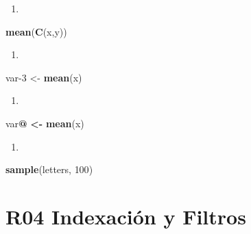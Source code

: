 \documentclass[]{book}
\newenvironment{Shaded}{\begin{snugshade}}{\end{snugshade}}
\newcommand{\DecValTok}[1]{\textcolor[rgb]{0.00,0.00,0.81}{#1}}
\newcommand{\ErrorTok}[1]{\textcolor[rgb]{0.64,0.00,0.00}{\textbf{#1}}}
\newcommand{\KeywordTok}[1]{\textcolor[rgb]{0.13,0.29,0.53}{\textbf{#1}}}
\newcommand{\NormalTok}[1]{#1}
\newcommand{\OperatorTok}[1]{\textcolor[rgb]{0.81,0.36,0.00}{\textbf{#1}}}
\newcommand{\StringTok}[1]{\textcolor[rgb]{0.31,0.60,0.02}{#1}}
\begin{document}
\begin{enumerate}
\def\labelenumi{\arabic{enumi}.}
\setcounter{enumi}{3}
\item
\end{enumerate}

\begin{Shaded}
\begin{Highlighting}[]
  \KeywordTok{mean}\NormalTok{(}\KeywordTok{C}\NormalTok{(x,y))}
\end{Highlighting}
\end{Shaded}

\begin{enumerate}
\def\labelenumi{\arabic{enumi}.}
\setcounter{enumi}{4}
\item
\end{enumerate}

\begin{Shaded}
\begin{Highlighting}[]
\NormalTok{  var}\DecValTok{-3}\NormalTok{ <-}\StringTok{ }\KeywordTok{mean}\NormalTok{(x)}
\end{Highlighting}
\end{Shaded}

\begin{enumerate}
\def\labelenumi{\arabic{enumi}.}
\setcounter{enumi}{5}
\item
\end{enumerate}

\begin{Shaded}
\begin{Highlighting}[]
\NormalTok{  var}\OperatorTok{@}\StringTok{ }\ErrorTok{<}\OperatorTok{-}\StringTok{ }\KeywordTok{mean}\NormalTok{(x)}
\end{Highlighting}
\end{Shaded}

\begin{enumerate}
\def\labelenumi{\arabic{enumi}.}
\setcounter{enumi}{6}
\item
\end{enumerate}

\begin{Shaded}
\begin{Highlighting}[]
  \KeywordTok{sample}\NormalTok{(letters, }\DecValTok{100}\NormalTok{)}
\end{Highlighting}
\end{Shaded}

\hypertarget{r04-indexaciuxf3n-y-filtros}{%
\chapter*{R04 Indexación y Filtros}\label{r04-indexaciuxf3n-y-filtros}}
\end{document}
